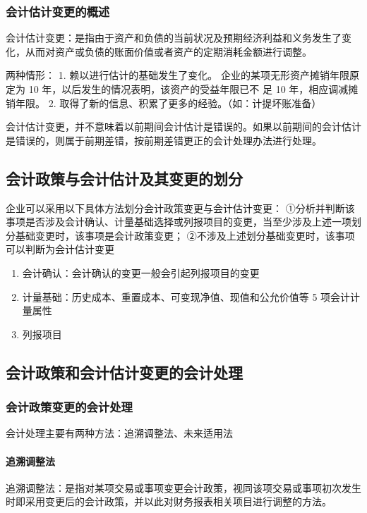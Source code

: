\documentclass[UTF8,12pt]{ctexart}
\numberwithin{equation}{section} %
\numberwithin{figure}{section}
\numberwithin{table}{section}
\begin{document}
	\subsubsection{会计估计变更的概述}
	会计估计变更：是指由于资产和负债的当前状况及预期经济利益和义务发生了变化，从而对资产或负债的账面价值或者资产的定期消耗金额进行调整。
	
	两种情形：
	1.	赖以进行估计的基础发生了变化。
	企业的某项无形资产摊销年限原定为 10 年，以后发生的情况表明，该资产的受益年限已不
	足 10 年，相应调减摊销年限。
	2.	取得了新的信息、积累了更多的经验。（如：计提坏账准备）
	
	会计估计变更，并不意味着以前期间会计估计是错误的。如果以前期间的会计估计是错误的，则属于前期差错，按前期差错更正的会计处理办法进行处理。
	
	\subsection{会计政策与会计估计及其变更的划分}
	企业可以采用以下具体方法划分会计政策变更与会计估计变更：
	①分析并判断该事项是否涉及会计确认、计量基础选择或列报项目的变更，当至少涉及上述一项划分基础变更时，该事项是会计政策变更；
	②不涉及上述划分基础变更时，该事项可以判断为会计估计变更
	
	\begin{enumerate}
		\item 会计确认：会计确认的变更一般会引起列报项目的变更
		
		\item 计量基础：历史成本、重置成本、可变现净值、现值和公允价值等 5 项会计计量属性
		
		\item 列报项目
	\end{enumerate}
	
	\subsection{会计政策和会计估计变更的会计处理}
	\subsubsection{会计政策变更的会计处理}
	会计处理主要有两种方法：追溯调整法、未来适用法
	
	\paragraph{追溯调整法}
	追溯调整法：是指对某项交易或事项变更会计政策，视同该项交易或事项初次发生时即采用变更后的会计政策，并以此对财务报表相关项目进行调整的方法。
	
\end{document}
